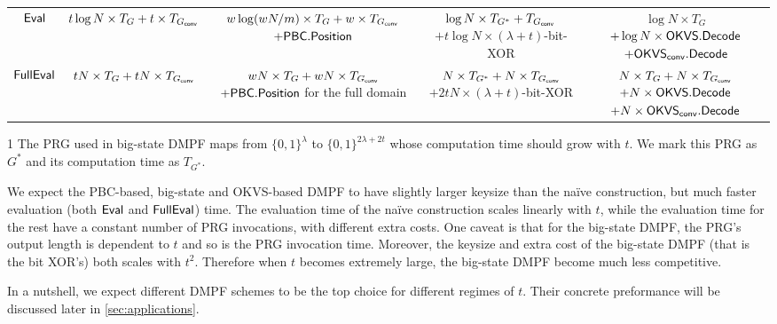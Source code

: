 \begin{table*}
\begin{threeparttable}
\begin{tabular}{ccccc}
        \cline{1-5}

	${\sf Eval}$ & $t\log N\times T_G+t\times T_{G_{\sf conv}}$ &\makecell{$w\log(wN/m)\times T_G + w\times T_{G_{\sf conv}}$\\$+{\sf PBC}.{\sf Position}$} & \makecell{$\log N\times T_{G^*} + T_{G_{\sf conv}}$\\$+t\log N \times (\lambda+t)$-bit-XOR}&\makecell{$\log N\times T_G$ \\$+\log N\times{\sf OKVS}.{\sf Decode}$\\ $+\OKVS_{\sf conv}.\Decode$} \\

        \cline{1-5}

	${\sf FullEval}$ & $tN\times T_G+tN\times T_{G_{\sf conv}}$ &\makecell{$wN\times T_G+ wN\times T_{G_{\sf conv}}$\\$+{\sf PBC}.{\sf Position}$ for the full domain} & \makecell{$N\times T_{G^*} + N\times T_{G_{\sf conv}}$\\$+2tN\times (\lambda+t)$-bit-XOR }& \makecell{$N\times T_G+N\times T_{G_{\sf conv}}$ \\  $+N\times{\sf OKVS}.{\sf Decode}$\\$+N\times {\sf OKVS}_{\sf conv}.{\sf Decode}$} \\
        \bottomrule
			\end{tabular}	
      \begin{tablenotes}
        \item [1] The PRG used in big-state DMPF maps from $\{0,1\}^\lambda$ to $\{0,1\}^{2\lambda+2t}$ whose computation time should grow with $t$. We mark this PRG as $G^*$ and its computation time as $T_{G^*}$. 
        \end{tablenotes}
    \end{threeparttable}
	\end{table*}
We expect the PBC-based, big-state and OKVS-based DMPF to have slightly larger keysize than the na\"ive construction, but much faster evaluation (both ${\sf Eval}$ and ${\sf FullEval}$) time. The evaluation time of the na\"ive construction scales linearly with $t$, while the evaluation time for the rest have a constant number of PRG invocations, with different extra costs. One caveat is that for the big-state DMPF, the PRG's output length is dependent to $t$ and so is the PRG invocation time. Moreover, the keysize and extra cost of the big-state DMPF (that is the bit XOR's) both scales with $t^2$. Therefore when $t$ becomes extremely large, the big-state DMPF become much less competitive. 

In a nutshell, we expect different DMPF schemes to be the top choice for  different regimes of $t$. Their concrete preformance will be discussed later in \cref{sec:applications}. 

